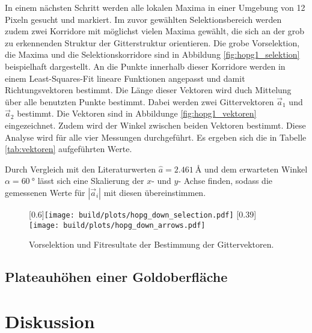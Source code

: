 In einem nächsten Schritt werden alle lokalen Maxima in einer Umgebung von
\num{12} Pixeln gesucht und markiert. Im zuvor gewählten Selektionsbereich
werden zudem zwei Korridore mit möglichst vielen Maxima gewählt, die sich an
der grob zu erkennenden Struktur der Gitterstruktur orientieren.
Die grobe Vorselektion, die Maxima und die Selektionskorridore sind in
Abbildung \ref{fig:hopg1_selektion} beispielhaft dargestellt.
An die Punkte innerhalb dieser Korridore werden in einem Least-Squares-Fit
lineare Funktionen angepasst und damit Richtungsvektoren bestimmt. Die Länge
dieser Vektoren wird duch Mittelung über alle benutzten Punkte bestimmt.
Dabei werden zwei Gittervektoren $\vec{a}_1$ und $\vec{a}_2$ bestimmt.
Die Vektoren sind in Abbildunge \ref{fig:hopg1_vektoren} eingezeichnet.
Zudem wird der Winkel zwischen beiden Vektoren bestimmt.
Diese Analyse wird für alle vier Messungen durchgeführt. Es ergeben sich die
in Tabelle \ref{tab:vektoren} aufgeführten Werte.
\begin{table}
    \centering
    \caption{
    }
    \label{tab:vektoren}
    
\end{table}

Durch Vergleich mit den Literaturwerten \cite{HOPG_gittervektoren} $\hat{a}
= \SI{2.461}{\angstrom}$ und dem erwarteten Winkel $\alpha = \SI{60}{\degree}$
lässt sich
eine Skalierung der $x$- und $y$- Achse finden, sodass die gemessenen Werte
für $\left|\vec{a}_i\right|$ mit diesen
übereinstimmen.
\begin{figure}
    \centering
    [0.6\linewidth]{\texttt{[image: build/plots/hopg\_down\_selection.pdf]}}
    [0.39\linewidth]{\texttt{[image: build/plots/hopg\_down\_arrows.pdf]}}
    \caption{Vorselektion und Fitresultate der Bestimmung der Gittervektoren.}
    \label{fig:hopg_fit}
\end{figure}

\subsection{Plateauhöhen einer Goldoberfläche}
\label{subsec:gold}

\clearpage
\section{Diskussion}
\label{sec:diskussion}
